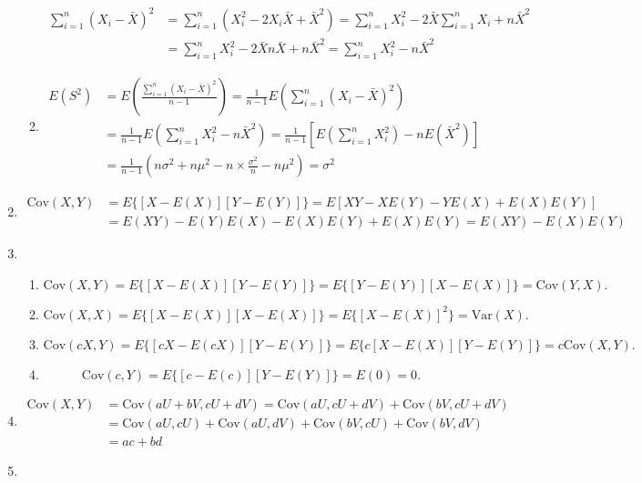 \begin{enumerate}[label=\arabic{section}.\arabic*]
\begin{enumerate}[label=\alph*)]
\begin{align*}
            \sum_{i=1}^n (X_i-\bar{X})^2 & =\sum_{i=1}^n (X_i^2-2X_i\bar{X}+\bar{X}^2) = \sum_{i=1}^n X_i^2-2\bar{X}\sum_{i=1}^n X_i+n\bar{X}^2\\
            & = \sum_{i=1}^n X_i^2-2\bar{X}n\bar{X}+n\bar{X}^2 = \sum_{i=1}^n X_i^2-n\bar{X}^2
        \end{align*}
        \item \begin{align*}
            E(S^2)&=E\left(\frac{\sum\limits_{i=1}^n (X_i-\bar{X})^2}{n-1}\right) = \frac{1}{n-1}E\left(\sum\limits_{i=1}^n (X_i-\bar{X})^2\right)\\
            & = \frac{1}{n-1}E\left(\sum_{i=1}^n X_i^2-n\bar{X}^2\right) = \frac{1}{n-1}\left[E\left(\sum_{i=1}^n X_i^2\right)-nE(\bar{X}^2)\right]\\
            & = \frac{1}{n-1}\left(n\sigma^2+n\mu^2-n\times\frac{\sigma^2}{n}-n\mu^2\right) = \sigma^2
        \end{align*}
    \end{enumerate}
    \item \pro
    \begin{align*}
        \mathrm{Cov}(X,Y)&=E\{[X-E(X)][Y-E(Y)]\}=E[XY-XE(Y)-YE(X)+E(X)E(Y)]\\
        &=E(XY)-E(Y)E(X)-E(X)E(Y)+E(X)E(Y)=E(XY)-E(X)E(Y)
    \end{align*}
    \item \pro
    \begin{enumerate}[label=\alph*)]
        \item \[\mathrm{Cov}(X,Y)=E\{[X-E(X)][Y-E(Y)]\}=E\{[Y-E(Y)][X-E(X)]\}=\mathrm{Cov}(Y,X).\]
        \item \[\mathrm{Cov}(X,X)=E\{[X-E(X)][X-E(X)]\}=E\{[X-E(X)]^2\}=\mathrm{Var}(X).\]
        \item \[\mathrm{Cov}(cX,Y)=E\{[cX-E(cX)][Y-E(Y)]\}=E\{c[X-E(X)][Y-E(Y)]\}=c\mathrm{Cov}(X,Y).\]
        \item \[\mathrm{Cov}(c,Y)=E\{[c-E(c)][Y-E(Y)]\}=E(0)=0.\]
    \end{enumerate}
    \item \sol
    \begin{align*}
        \mathrm{Cov}(X,Y)&=\mathrm{Cov}(aU+bV,cU+dV)=\mathrm{Cov}(aU,cU+dV)+\mathrm{Cov}(bV,cU+dV)\\
        &=\mathrm{Cov}(aU,cU)+\mathrm{Cov}(aU,dV)+\mathrm{Cov}(bV,cU)+\mathrm{Cov}(bV,dV)\\
        &=ac+bd
    \end{align*}
    \item \sol

\end{enumerate}
